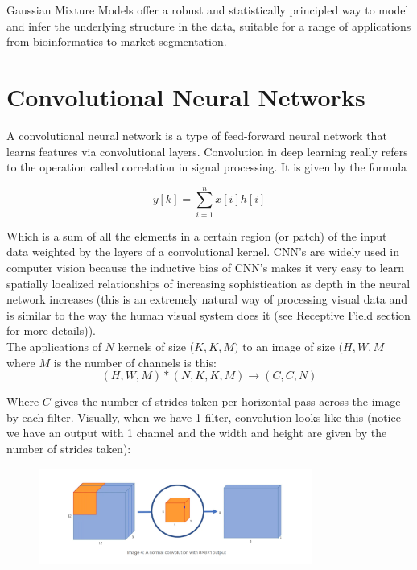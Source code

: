 \documentclass[12pt]{article}
\begin{document}
Gaussian Mixture Models offer a robust and statistically principled way to model and infer the underlying structure in the data, suitable for a range of applications from bioinformatics to market segmentation.

\section{Convolutional Neural Networks}
A convolutional neural network is a type of feed-forward neural network that learns features via convolutional layers. Convolution in deep learning really refers to the operation called correlation in signal processing. It is given by the formula

\[y[k] = \sum_{i=1}^n x[i]h[i]\]

Which is a sum of all the elements in a certain region (or patch) of the input data weighted by the layers of a convolutional kernel. CNN's are widely used in computer vision because the inductive bias of CNN's makes it very easy to learn spatially localized relationships of increasing sophistication as depth in the neural network increases (this is an extremely natural way of processing visual data and is similar to the way the human visual system does it (see Receptive Field section for more details)). \\

The applications of \(N\) kernels of size (\(K, K, M)\) to an image of size \((H, W, M\) where \(M\) is the number of channels is this: 
\[(H, W, M) * (N, K, K, M) \rightarrow (C, C, N)\]

Where \(C\) gives the number of strides taken per horizontal pass across the image by each filter. Visually, when we have 1 filter, convolution looks like this (notice we have an output with 1 channel and the width and height are given by the number of strides taken):

\begin{figure}[H]
    \centering
    \includegraphics[width=0.8\textwidth]{./convolution.png} %
\end{figure}
\end{document}
